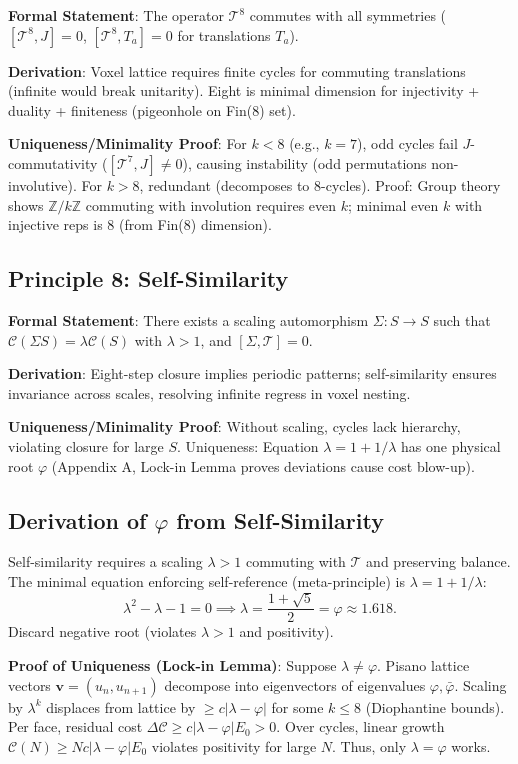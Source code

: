 \documentclass[twocolumn,prd,amsmath,amssymb,aps,superscriptaddress,nofootinbib]{revtex4-2}
\begin{document}
\textbf{Formal Statement}: The operator $\mathcal{T}^8$ commutes with all symmetries ($[\mathcal{T}^8, J] = 0$, $[\mathcal{T}^8, T_a] = 0$ for translations $T_a$).

\textbf{Derivation}: Voxel lattice requires finite cycles for commuting translations (infinite would break unitarity). Eight is minimal dimension for injectivity + duality + finiteness (pigeonhole on Fin(8) set).

\textbf{Uniqueness/Minimality Proof}: For $k<8$ (e.g., $k=7$), odd cycles fail $J$-commutativity ($[\mathcal{T}^7, J] \neq 0$), causing instability (odd permutations non-involutive). For $k>8$, redundant (decomposes to 8-cycles). Proof: Group theory shows $\mathbb{Z}/k\mathbb{Z}$ commuting with involution requires even $k$; minimal even $k$ with injective reps is 8 (from Fin(8) dimension).

\subsection{Principle 8: Self-Similarity}
\label{subsec:principle-8}

\textbf{Formal Statement}: There exists a scaling automorphism $\Sigma: S \to S$ such that $\mathcal{C}(\Sigma S) = \lambda \mathcal{C}(S)$ with $\lambda > 1$, and $[\Sigma, \mathcal{T}] = 0$.

\textbf{Derivation}: Eight-step closure implies periodic patterns; self-similarity ensures invariance across scales, resolving infinite regress in voxel nesting.

\textbf{Uniqueness/Minimality Proof}: Without scaling, cycles lack hierarchy, violating closure for large $S$. Uniqueness: Equation $\lambda = 1 + 1/\lambda$ has one physical root $\varphi$ (Appendix A, Lock-in Lemma proves deviations cause cost blow-up).

\subsection{Derivation of $\varphi$ from Self-Similarity}
\label{subsec:derivation-phi}

Self-similarity requires a scaling $\lambda > 1$ commuting with $\mathcal{T}$ and preserving balance. The minimal equation enforcing self-reference (meta-principle) is $\lambda = 1 + 1/\lambda$:
\[
\lambda^2 - \lambda - 1 = 0 \implies \lambda = \frac{1 + \sqrt{5}}{2} = \varphi \approx 1.618.
\]
Discard negative root (violates $\lambda > 1$ and positivity). 

\textbf{Proof of Uniqueness (Lock-in Lemma)}: Suppose $\lambda \neq \varphi$. Pisano lattice vectors $\mathbf{v} = (u_n, u_{n+1})$ decompose into eigenvectors of eigenvalues $\varphi, \bar{\varphi}$. Scaling by $\lambda^k$ displaces from lattice by $\geq c |\lambda - \varphi|$ for some $k \leq 8$ (Diophantine bounds). Per face, residual cost $\Delta \mathcal{C} \geq c |\lambda - \varphi| E_0 > 0$. Over cycles, linear growth $\mathcal{C}(N) \geq N c |\lambda - \varphi| E_0$ violates positivity for large $N$. Thus, only $\lambda = \varphi$ works.
\end{document}
